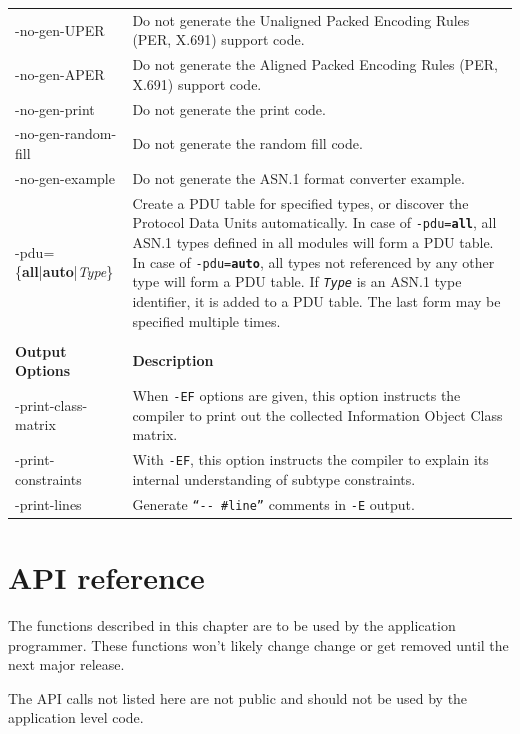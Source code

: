 \documentclass[english,oneside,12pt]{book}
\begin{document}
\begin{longtable}{lp{4in}}
{\ttfamily -no-gen-UPER} & {\small Do not generate the Unaligned Packed Encoding Rules (PER, X.691) support code.}\\
{\ttfamily -no-gen-APER} & {\small Do not generate the Aligned Packed Encoding Rules (PER, X.691) support code.}\\
{\ttfamily -no-gen-print} & {\small Do not generate the print code.}\\
{\ttfamily -no-gen-random-fill} & {\small Do not generate the random fill code.}\\
{\ttfamily -no-gen-example} & {\small Do not generate the ASN.1 format converter example.}\\
{\ttfamily -pdu=\{\textbf{all}|\textbf{auto}|\emph{Type}\}} & {\small Create a PDU table for specified types, or discover the Protocol Data Units automatically.
In case of \texttt{-pdu=\textbf{all}}, all ASN.1 types defined in all modules will form a PDU table. In case of \texttt{-pdu=\textbf{auto}}, all types not referenced by any other type will form a PDU table. If \texttt{\emph{Type}} is an ASN.1 type identifier, it is added to a PDU table. The last form may be specified multiple times.}\\ \\
\textbf{Output Options} & \textbf{Description}\\
\midrule
{\ttfamily -print-class-matrix} & {\small When \texttt{-EF} options are given, this option instructs the compiler to print out the collected Information Object Class matrix.}\\
{\ttfamily -print-constraints} & {\small With \texttt{-EF}, this option instructs the compiler
to explain its internal understanding of subtype constraints.}\\
{\ttfamily -print-lines} & {\small Generate \texttt{``-{}- \#line''} comments
in \texttt{-E} output.}\\
\end{longtable}
\renewcommand{\arraystretch}{1}


\chapter{API reference}

The functions described in this chapter are to be used by the application
programmer. These functions won't likely change change or get removed until
the next major release.

The API calls not listed here are not public and should not be used by the
application level code.
\end{document}
